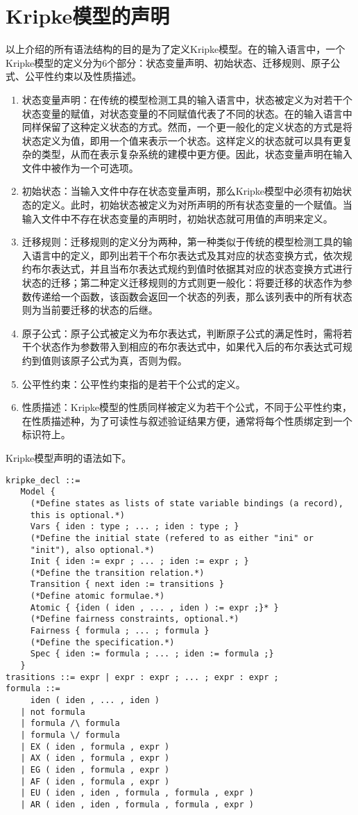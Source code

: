 \section{Kripke模型的声明}
以上介绍的所有语法结构的目的是为了定义Kripke模型。在\sctlprov{}的输入语言中，一个Kripke模型的定义分为6个部分：状态变量声明、初始状态、迁移规则、原子公式、公平性约束以及性质描述。
\begin{enumerate}
	\item 状态变量声明：在传统的模型检测工具的输入语言中，状态被定义为对若干个状态变量的赋值，对状态变量的不同赋值代表了不同的状态。在\sctlprov{}的输入语言中同样保留了这种定义状态的方式。然而，一个更一般化的定义状态的方式是将状态定义为值，即用一个值来表示一个状态。这样定义的状态就可以具有更复杂的类型，从而在表示复杂系统的建模中更方便。因此，状态变量声明在输入文件中被作为一个可选项。
	\item 初始状态：当输入文件中存在状态变量声明，那么Kripke模型中必须有初始状态的定义。此时，初始状态被定义为对所声明的所有状态变量的一个赋值。当输入文件中不存在状态变量的声明时，初始状态就可用值的声明来定义。
	\item 迁移规则：迁移规则的定义分为两种，第一种类似于传统的模型检测工具的输入语言中的定义，即列出若干个布尔表达式及其对应的状态变换方式，依次规约布尔表达式，并且当布尔表达式规约到值时依据其对应的状态变换方式进行状态的迁移；第二种定义迁移规则的方式则更一般化：将要迁移的状态作为参数传递给一个函数，该函数会返回一个状态的列表，那么该列表中的所有状态则为当前要迁移的状态的后继。
	\item 原子公式：原子公式被定义为布尔表达式，判断原子公式的满足性时，需将若干个状态作为参数带入到相应的布尔表达式中，如果代入后的布尔表达式可规约到值则该原子公式为真，否则为假。
	\item 公平性约束：公平性约束指的是若干个\CTLP{}公式的定义。
	\item 性质描述：Kripke模型的性质同样被定义为若干个\CTLP{}公式，不同于公平性约束，在性质描述种，为了可读性与叙述验证结果方便，通常将每个性质绑定到一个标识符上。
\end{enumerate}
Kripke模型声明的语法如下。
\begin{verbatim}
kripke_decl ::=  
   Model { 
     (*Define states as lists of state variable bindings (a record), 
     this is optional.*)
     Vars { iden : type ; ... ; iden : type ; }
     (*Define the initial state (refered to as either "ini" or 
     "init"), also optional.*)
     Init { iden := expr ; ... ; iden := expr ; }
     (*Define the transition relation.*)
     Transition { next iden := transitions }
     (*Define atomic formulae.*)
     Atomic { {iden ( iden , ... , iden ) := expr ;}* }		
     (*Define fairness constraints, optional.*)
     Fairness { formula ; ... ; formula }
     (*Define the specification.*)
     Spec { iden := formula ; ... ; iden := formula ;}
   }
trasitions ::= expr | expr : expr ; ... ; expr : expr ;
formula ::= 
     iden ( iden , ... , iden )
   | not formula
   | formula /\ formula
   | formula \/ formula
   | EX ( iden , formula , expr )
   | AX ( iden , formula , expr )
   | EG ( iden , formula , expr )
   | AF ( iden , formula , expr )
   | EU ( iden , iden , formula , formula , expr )
   | AR ( iden , iden , formula , formula , expr )
\end{verbatim}
